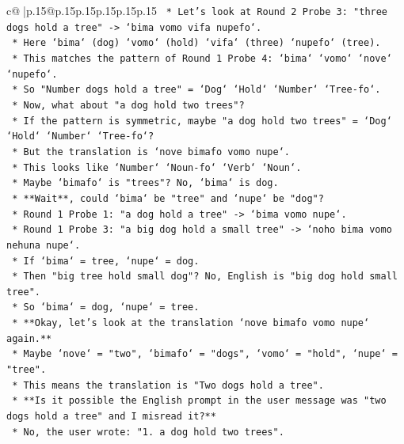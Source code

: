 \documentclass{article}
\begin{document}
{\begin{supertabular}{c@{$\;$}|p{.15\linewidth}@{}p{.15\linewidth}p{.15\linewidth}p{.15\linewidth}p{.15\linewidth}p{.15\linewidth}}
{{{\texttt{            *   Let's look at Round 2 Probe 3: "three dogs hold a tree" {-}> `bima vomo vifa nupefo`.} \\
\texttt{            *   Here `bima` (dog) `vomo` (hold) `vifa` (three) `nupefo` (tree).} \\
\texttt{            *   This matches the pattern of Round 1 Probe 4: `bima` `vomo` `nove` `nupefo`.} \\
\texttt{            *   So "Number dogs hold a tree" = `Dog` `Hold` `Number` `Tree{-}fo`.} \\
\texttt{            *   Now, what about "a dog hold two trees"?} \\
\texttt{            *   If the pattern is symmetric, maybe "a dog hold two trees" = `Dog` `Hold` `Number` `Tree{-}fo`?} \\
\texttt{            *   But the translation is `nove bimafo vomo nupe`.} \\
\texttt{            *   This looks like `Number` `Noun{-}fo` `Verb` `Noun`.} \\
\texttt{            *   Maybe `bimafo` is "trees"? No, `bima` is dog.} \\
\texttt{            *   **Wait**, could `bima` be "tree" and `nupe` be "dog"?} \\
\texttt{            *   Round 1 Probe 1: "a dog hold a tree" {-}> `bima vomo nupe`.} \\
\texttt{            *   Round 1 Probe 3: "a big dog hold a small tree" {-}> `noho bima vomo nehuna nupe`.} \\
\texttt{            *   If `bima` = tree, `nupe` = dog.} \\
\texttt{            *   Then "big tree hold small dog"? No, English is "big dog hold small tree".} \\
\texttt{            *   So `bima` = dog, `nupe` = tree.} \\
\texttt{            *   **Okay, let's look at the translation `nove bimafo vomo nupe` again.**} \\
\texttt{            *   Maybe `nove` = "two", `bimafo` = "dogs", `vomo` = "hold", `nupe` = "tree".} \\
\texttt{            *   This means the translation is "Two dogs hold a tree".} \\
\texttt{            *   **Is it possible the English prompt in the user message was "two dogs hold a tree" and I misread it?**} \\
\texttt{            *   No, the user wrote: "1. a dog hold two trees".} \\
}}}
\end{supertabular}}
\end{document}
